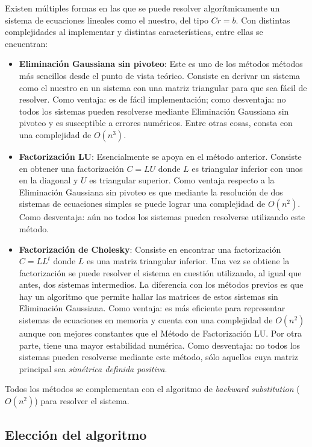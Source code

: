Existen múltiples formas en las que se puede resolver algorítmicamente un sistema de ecuaciones lineales como el nuestro, del tipo $C r = b$. Con distintas complejidades al implementar y distintas características, entre ellas se encuentran:

\begin{itemize}
    \item \textbf{Eliminación Gaussiana sin pivoteo}: Este es uno de los métodos métodos más sencillos desde el punto de vista teórico. Consiste en derivar un sistema como el nuestro en un sistema con una matriz triangular para que sea fácil de resolver. Como ventaja: es de fácil implementación; como desventaja: no todos los sistemas pueden resolverse mediante Eliminación Gaussiana sin pivoteo y es susceptible a errores numéricos. Entre otras cosas, consta con una complejidad de $O(n^3)$.
    \item \textbf{Factorización LU}: Esencialmente se apoya en el método anterior. Consiste en obtener una factorización $C = LU$ donde $L$ es triangular inferior con unos en la diagonal y $U$ es triangular superior. Como ventaja respecto a la Eliminación Gaussiana sin pivoteo es que mediante la resolución de dos sistemas de ecuaciones simples se puede lograr una complejidad de $O(n^2)$. Como desventaja: aún no todos los sistemas pueden resolverse utilizando este método.
    \item \textbf{Factorización de Cholesky}: Consiste en encontrar una factorización $C = LL^t$ donde $L$ es una matriz triangular inferior. Una vez se obtiene la factorización se puede resolver el sistema en cuestión utilizando, al igual que antes, dos sistemas intermedios. La diferencia con los métodos previos es que hay un algoritmo que permite hallar las matrices de estos sistemas sin Eliminación Gaussiana. Como ventaja: es más eficiente para representar sistemas de ecuaciones en memoria y cuenta con una complejidad de $O(n^2)$ aunque con mejores constantes que el Método de Factorización LU. Por otra parte, tiene una mayor estabilidad numérica. Como desventaja: no todos los sistemas pueden resolverse mediante este método, sólo aquellos cuya matriz principal sea \textit{simétrica definida positiva}.
\end{itemize}

Todos los métodos se complementan con el algoritmo de \textit{backward substitution} ($O(n^2)$) para resolver el sistema.

\subsection{Elección del algoritmo}

